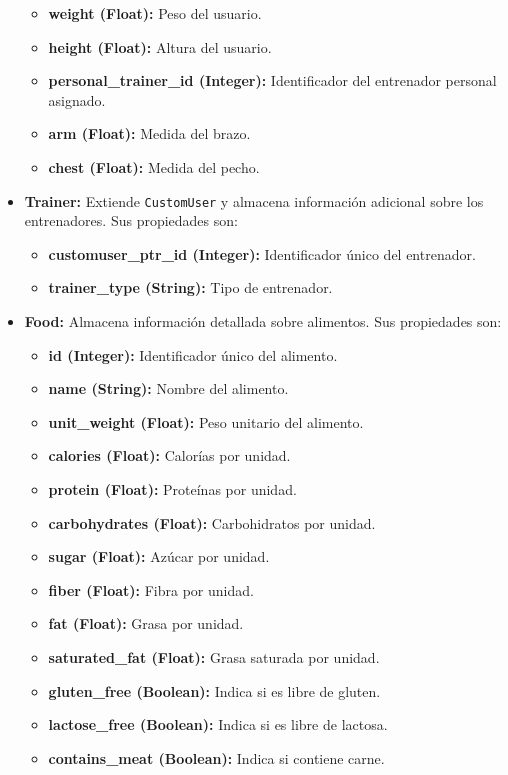\begin{itemize}
\begin{itemize}
        \item \textbf{weight (Float):} Peso del usuario.
        \item \textbf{height (Float):} Altura del usuario.
        \item \textbf{personal\_trainer\_id (Integer):} Identificador del entrenador personal asignado.
        \item \textbf{arm (Float):} Medida del brazo.
        \item \textbf{chest (Float):} Medida del pecho.
    \end{itemize}
    \item \textbf{Trainer:} Extiende \texttt{CustomUser} y almacena información adicional sobre los entrenadores. Sus propiedades son:
    \begin{itemize}
        \item \textbf{customuser\_ptr\_id (Integer):} Identificador único del entrenador.
        \item \textbf{trainer\_type (String):} Tipo de entrenador.
    \end{itemize}
    \item \textbf{Food:} Almacena información detallada sobre alimentos. Sus propiedades son:
    \begin{itemize}
        \item \textbf{id (Integer):} Identificador único del alimento.
        \item \textbf{name (String):} Nombre del alimento.
        \item \textbf{unit\_weight (Float):} Peso unitario del alimento.
        \item \textbf{calories (Float):} Calorías por unidad.
        \item \textbf{protein (Float):} Proteínas por unidad.
        \item \textbf{carbohydrates (Float):} Carbohidratos por unidad.
        \item \textbf{sugar (Float):} Azúcar por unidad.
        \item \textbf{fiber (Float):} Fibra por unidad.
        \item \textbf{fat (Float):} Grasa por unidad.
        \item \textbf{saturated\_fat (Float):} Grasa saturada por unidad.
        \item \textbf{gluten\_free (Boolean):} Indica si es libre de gluten.
        \item \textbf{lactose\_free (Boolean):} Indica si es libre de lactosa.
        \item \textbf{contains\_meat (Boolean):} Indica si contiene carne.

\end{itemize}
\end{itemize}
